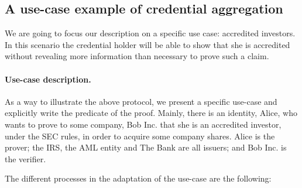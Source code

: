 \subsection{A use-case example of credential aggregation}
\label{sec:apps:id-framework:use-case-credential-aggregation}



We are going to focus our description on a specific use case: accredited investors. 
In this scenario the credential holder will be able to show that she is accredited without revealing more information than necessary to prove such a claim. 


\paragraph{Use-case description.}
As a way to illustrate the above protocol, we present a specific use-case and explicitly write the predicate of the proof. Mainly, there is an identity, Alice, who wants to prove to some company, Bob Inc. that she is an accredited investor, under the SEC rules, in order to acquire some company shares. Alice is the prover; the IRS, the AML entity and The Bank are all issuers; and Bob Inc. is the verifier.

The different processes in the adaptation of the use-case are the following:

